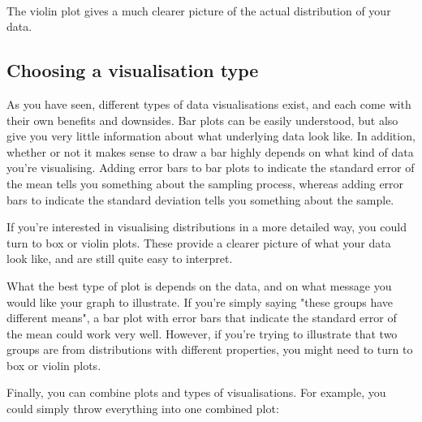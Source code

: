 \documentclass[11pt]{article}
\begin{document}
    \begin{center}
    \end{center}
    { \hspace*{\fill} \\}
    
    The violin plot gives a much clearer picture of the actual distribution
of your data.

    \subsection{Choosing a visualisation
type}\label{choosing-a-visualisation-type}

As you have seen, different types of data visualisations exist, and each
come with their own benefits and downsides. Bar plots can be easily
understood, but also give you very little information about what
underlying data look like. In addition, whether or not it makes sense to
draw a bar highly depends on what kind of data you're visualising.
Adding error bars to bar plots to indicate the standard error of the
mean tells you something about the sampling process, whereas adding
error bars to indicate the standard deviation tells you something about
the sample.

If you're interested in visualising distributions in a more detailed
way, you could turn to box or violin plots. These provide a clearer
picture of what your data look like, and are still quite easy to
interpret.

What the best type of plot is depends on the data, and on what message
you would like your graph to illustrate. If you're simply saying "these
groups have different means", a bar plot with error bars that indicate
the standard error of the mean could work very well. However, if you're
trying to illustrate that two groups are from distributions with
different properties, you might need to turn to box or violin plots.

Finally, you can combine plots and types of visualisations. For example,
you could simply throw everything into one combined plot:
\end{document}
